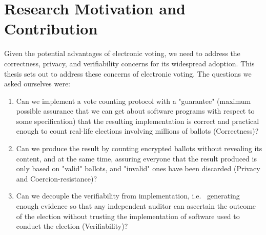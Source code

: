 \section{Research Motivation and Contribution}
Given the potential advantages of electronic voting,  we need to address
the correctness, privacy, and verifiability concerns for its widespread adoption. 
This thesis sets out to address these concerns of electronic voting. 
The questions we asked ourselves were:
 \begin{enumerate} 
  \item Can we implement a vote counting protocol with a "guarantee"
  (maximum possible assurance that we can get about software programs
   with respect to some specification) 
   that the resulting implementation is correct and  practical enough
    to count  real-life elections involving millions of ballots (Correctness)?

  \item Can we produce the result by counting encrypted ballots without revealing 
  its content, and at the same time, 
  assuring everyone that the result produced is only based on "valid" ballots, 
  and "invalid" ones have been discarded  (Privacy and Coercion-resistance)?
 \item Can we decouple the verifiability from implementation, i.e. 
    ~generating enough evidence so that any independent auditor can 
    ascertain the outcome of the election without trusting the implementation 
    of software used to conduct the election (Verifiability)?
  \end{enumerate}


